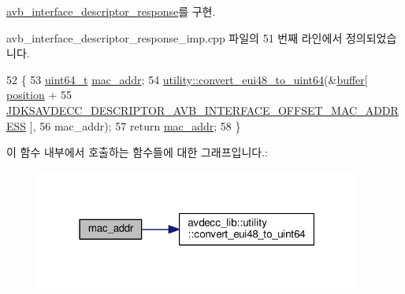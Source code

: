 \hyperlink{classavdecc__lib_1_1avb__interface__descriptor__response_aeefc128adde1e419ae731c1a05791053}{avb\+\_\+interface\+\_\+descriptor\+\_\+response}를 구현.



avb\+\_\+interface\+\_\+descriptor\+\_\+response\+\_\+imp.\+cpp 파일의 51 번째 라인에서 정의되었습니다.


\begin{DoxyCode}
52 \{
53     \hyperlink{parse_8c_aec6fcb673ff035718c238c8c9d544c47}{uint64\_t} \hyperlink{classavdecc__lib_1_1avb__interface__descriptor__response__imp_aa41cab1c99d5543c3cab2d6ab5e0aa33}{mac\_addr};
54     \hyperlink{namespaceavdecc__lib_1_1utility_a93805682670fa173878eaecac28efc2c}{utility::convert\_eui48\_to\_uint64}(&\hyperlink{classavdecc__lib_1_1descriptor__response__base__imp_a56ed84df35de10bdb65e72b184309497}{buffer}[
      \hyperlink{classavdecc__lib_1_1descriptor__response__base__imp_a7a04afe5347934be732ec70a70bd0a28}{position} +
55                                              
      \hyperlink{group__descriptor__avb__interface_ga74e72a571e5b25583bd0900a5adfde1a}{JDKSAVDECC\_DESCRIPTOR\_AVB\_INTERFACE\_OFFSET\_MAC\_ADDRESS}
      ],
56                                      mac\_addr);
57     \textcolor{keywordflow}{return} \hyperlink{classavdecc__lib_1_1avb__interface__descriptor__response__imp_aa41cab1c99d5543c3cab2d6ab5e0aa33}{mac\_addr};
58 \}
\end{DoxyCode}


이 함수 내부에서 호출하는 함수들에 대한 그래프입니다.\+:
\nopagebreak
\begin{figure}[H]
\begin{center}
\leavevmode
\includegraphics[width=303pt]{classavdecc__lib_1_1avb__interface__descriptor__response__imp_aa41cab1c99d5543c3cab2d6ab5e0aa33_cgraph}
\end{center}
\end{figure}


